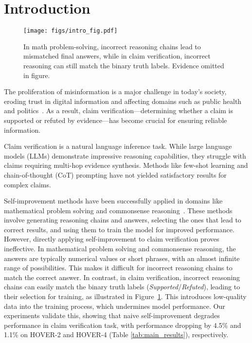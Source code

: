 \section{Introduction}

\begin{figure}[tb]
  \texttt{[image: figs/intro\_fig.pdf]}
  \caption{In math problem-solving, incorrect reasoning chains lead to mismatched final answers, while in claim verification, incorrect reasoning can still match the binary truth labels. Evidence omitted in figure.}
  \label{fig:intro_fig}
\end{figure}
The proliferation of misinformation is a major challenge in today's society, eroding trust in digital information and affecting domains such as public health~\cite{Naeem2020TheC} and politics~\cite{mishra2022factify}. As a result, claim verification---determining whether a claim is supported or refuted by evidence---has become crucial for ensuring reliable information.

Claim verification is a natural language inference task. While large language models (LLMs) demonstrate impressive reasoning capabilities, they struggle with claims requiring multi-hop evidence synthesis. Methods like few-shot learning and chain-of-thought (CoT) prompting have not yielded satisfactory results for complex claims.

Self-improvement methods have been successfully applied in domains like mathematical problem solving and commonsense reasoning~\cite{zelikman2022star,hosseini2024v}. These methods involve generating reasoning chains and answers, selecting the ones that lead to correct results, and using them to train the model for improved performance. However, directly applying self-improvement to claim verification proves ineffective. In mathematical problem solving and commonsense reasoning, the answers are typically numerical values or short phrases, with an almost infinite range of possibilities. This makes it difficult for incorrect reasoning chains to match the correct answer. In contrast, in claim verification, incorrect reasoning chains can easily match the binary truth labels (\textit{Supported}/\textit{Refuted}), leading to their selection for training, as illustrated in Figure~\ref{fig:intro_fig}. This introduces low-quality data into the training process, which undermines model performance. Our experiments validate this, showing that naive self-improvement degrades performance in claim verification task, with performance dropping by 4.5\% and 1.1\% on HOVER-2 and HOVER-4 (Table \ref{tab:main_results}), respectively.

